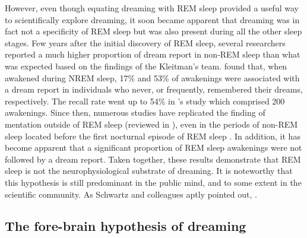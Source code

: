 However, even though equating dreaming with REM sleep provided a useful way to scientifically explore dreaming, it soon became apparent that dreaming was in fact not a specificity of REM sleep but was also present during all the other sleep stages. Few years after the initial discovery of REM sleep, several researchers reported a much higher proportion of dream report in non-REM sleep than what was expected based on the findings of the Kleitman’s team. \citet{goodenough_comparison_1959} found that, when awakened during NREM sleep, 17\% and 53\% of awakenings were associated with a dream report in individuals who never, or frequently, remembered their dreams, respectively. The recall rate went up to 54\% in \citet{foulkes_dream_1962}'s study which comprised 200 awakenings. Since then, numerous studies have replicated the finding of mentation outside of REM sleep (reviewed in \citealp{nielsen_review_2000}), even in the periods of non-REM sleep located before the first nocturnal episode of REM sleep \citep{noreika_early-night_2009}. In addition, it has become apparent that a significant proportion of REM sleep awakenings were not followed by a dream report. Taken together, these results demonstrate that REM sleep is not the neurophysiological substrate of dreaming. It is noteworthy that this hypothesis is still predominant in the public mind, and to some extent in the scientific community. As Schwartz and colleagues aptly pointed out,  \citep{schwartz_dreaming:_2005}.

\subsection{The fore-brain hypothesis of dreaming}
\label{sec:dream-research:link:solms}

